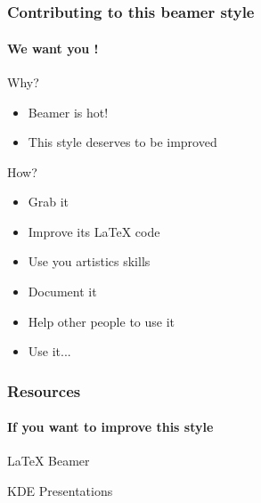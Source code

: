 \documentclass[12pt]{beamer}
\begin{document}
\section*{}
\begin{frame}
  \frametitle{Contributing to this beamer style}
  \framesubtitle{We want you !}

  \begin{block}{Why?}
  \begin{itemize}
    \item Beamer is hot!
    \item This style deserves to be improved
  \end{itemize}
  \end{block}

  \begin{block}{How?}
  \begin{itemize}
    \item Grab it
    \item Improve its LaTeX code
    \item Use you artistics skills
    \item Document it
    \item Help other people to use it
    \item Use it...
  \end{itemize}
  \end{block}
\end{frame}

\begin{frame}
  \frametitle{Resources}
  \framesubtitle{If you want to improve this style}
  \begin{thebibliography}{10}

  \beamertemplatearticlebibitems

    LaTeX Beamer

    KDE Presentations

  \end{thebibliography}
\end{frame}

\end{document}
